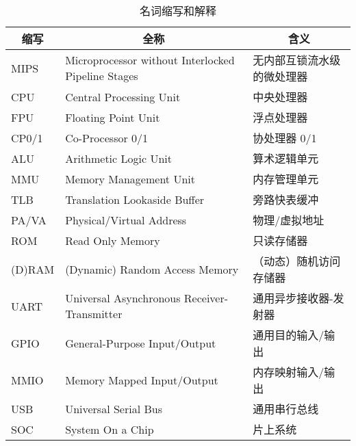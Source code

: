 \begin{table}[!htbp]
    \centering
    \caption{名词缩写和解释}
    \label{table:abbreviation_definition}
    
    \begin{tabular}{|l|l|l|}
    \hline
    \multicolumn{1}{|c|}{\textbf{缩写}} & \multicolumn{1}{c|}{\textbf{全称}}                   & \multicolumn{1}{c|}{\textbf{含义}} \\ \hline
    MIPS                              & Microprocessor without Interlocked Pipeline Stages & 无内部互锁流水级的微处理器                    \\ \hline
    CPU                               & Central Processing Unit                            & 中央处理器                            \\ \hline
    FPU                               & Floating Point Unit                                & 浮点处理器                            \\ \hline
    CP0/1                             & Co-Processor 0/1                                   & 协处理器 0/1                         \\ \hline
    ALU                               & Arithmetic Logic Unit                              & 算术逻辑单元                           \\ \hline
    MMU                               & Memory Management Unit                             & 内存管理单元                           \\ \hline
    TLB                               & Translation Lookaside Buffer                       & 旁路快表缓冲                           \\ \hline
    PA/VA                             & Physical/Virtual Address                           & 物理/虚拟地址                          \\ \hline
    ROM                               & Read Only Memory                                   & 只读存储器                            \\ \hline
    (D)RAM                            & (Dynamic) Random Access Memory                     & （动态）随机访问存储器                      \\ \hline
    UART                              & Universal Asynchronous Receiver-Transmitter        & 通用异步接收器-发射器                      \\ \hline
    GPIO                              & General-Purpose Input/Output                       & 通用目的输入/输出                        \\ \hline
    MMIO                              & Memory Mapped Input/Output                         & 内存映射输入/输出                        \\ \hline
    USB                               & Universal Serial Bus                               & 通用串行总线                        \\ \hline
    SOC                               & System On a Chip                                   & 片上系统                             \\ \hline
    \end{tabular}
\end{table}

